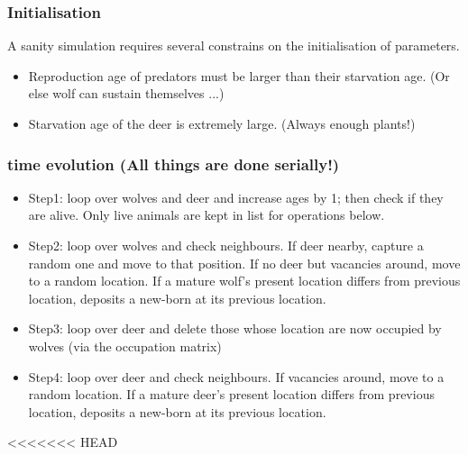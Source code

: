 \documentclass{beamer}
\begin{document}
\frame
{
  \frametitle{Initialisation}
  A sanity simulation requires several constrains on the initialisation of parameters.
  \begin{itemize}
  \item<1->{Reproduction age of predators must be larger than their starvation age. (Or else wolf can sustain themselves ...)}
  \item<2->{Starvation age of the deer is extremely large. (Always enough plants!)}
  \end{itemize} 
}

\frame
{
  \frametitle{time evolution (All things are done serially!)}
  \begin{itemize}
  \item<1->{Step1: loop over wolves and deer and increase ages by 1; then check if they are alive. Only live animals are kept in list for operations below.}
  \item<2->{Step2: loop over wolves and check neighbours. If deer nearby, capture a random one and move to that position. If no deer but vacancies around, move to a random location. If a mature wolf's present location differs from previous location, deposits a new-born at its previous location.} 
  \item<3->{Step3: loop over deer and delete those whose location are now occupied by wolves (via the occupation matrix)}
  \item<4->{Step4: loop over deer and check neighbours. If vacancies around, move to a random location. If a mature deer's present location differs from previous location, deposits a new-born at its previous location.} 
  \end{itemize} 
  
}
<<<<<<< HEAD
\end{document}
